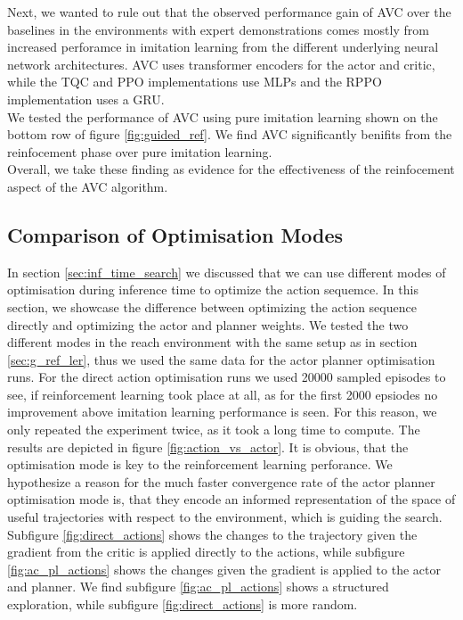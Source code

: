 Next, we wanted to rule out that the observed performance gain of AVC over the baselines in the environments with expert demonstrations comes mostly from increased perforamce in imitation learning 
from the different underlying neural network architectures. AVC uses transformer encoders for the actor and 
critic, while the TQC and PPO implementations use MLPs and the RPPO implementation uses a GRU.\\ 
We tested the performance of AVC using pure imitation learning shown on the bottom row of
figure \ref{fig:guided_ref}. We find AVC significantly benifits from the reinfocement phase over pure imitation learning. \\
Overall, we take these finding as evidence for the effectiveness of the reinfocement aspect of the AVC algorithm.

\subsection{Comparison of Optimisation Modes}
\label{ref:com_opt_modes}
In section \ref{sec:inf_time_search} we discussed that we can use different modes of optimisation during inference time to optimize the action sequemce. In this section, 
we showcase the difference between optimizing the action sequence directly and optimizing the actor and planner weights. We tested the two different 
modes in the reach environment with the same setup as in section \ref{sec:g_ref_ler}, thus we used the same data for the actor planner optimisation runs. For the direct 
action optimisation runs we used 20000 sampled episodes to see, if reinforcement learning took place at all, as for the first 2000 epsiodes no improvement above 
imitation learning performance is seen. For this reason, we only repeated the experiment twice, as it took a long time to compute. The results are depicted in figure 
\ref{fig:action_vs_actor}. It is obvious, that the optimisation mode is key to the reinforcement learning perforance. We hypothesize a reason for the much 
faster convergence rate of the actor planner optimisation mode is, that they encode an informed representation of the space of useful trajectories with 
respect to the environment, which is guiding the search. Subfigure \ref{fig:direct_actions} shows the changes to the trajectory given the gradient from the critic is applied 
directly to the actions, while subfigure \ref{fig:ac_pl_actions} shows the changes given the gradient is applied to the actor and planner. We find 
subfigure \ref{fig:ac_pl_actions} shows a structured exploration, while subfigure \ref{fig:direct_actions} is more random. 

